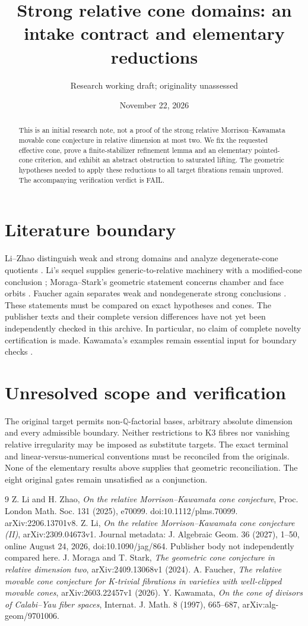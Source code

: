 \documentclass[11pt]{article}
\title{Strong relative cone domains: an intake contract and elementary reductions}
\author{Research working draft; originality unassessed}
\date{November 22, 2026}
\begin{document}
\maketitle
\begin{abstract}
This is an initial research note, not a proof of the strong relative Morrison--Kawamata movable cone conjecture in relative dimension at most two. We fix the requested effective cone, prove a finite-stabilizer refinement lemma and an elementary pointed-cone criterion, and exhibit an abstract obstruction to saturated lifting. The geometric hypotheses needed to apply these reductions to all target fibrations remain unproved. The accompanying verification verdict is FAIL.
\end{abstract}

\section{Literature boundary}
Li--Zhao distinguish weak and strong domains and analyze degenerate-cone quotients \cite{LZ}. Li's sequel supplies generic-to-relative machinery with a modified-cone conclusion \cite{Li}; Moraga--Stark's geometric statement concerns chamber and face orbits \cite{MS}. Faucher again separates weak and nondegenerate strong conclusions \cite{F}. These statements must be compared on exact hypotheses and cones. The publisher texts and their complete version differences have not yet been independently checked in this archive. In particular, no claim of complete novelty certification is made. Kawamata's examples remain essential input for boundary checks \cite{K}.

\section{Unresolved scope and verification}
The original target permits non-$\mathbb Q$-factorial bases, arbitrary absolute dimension and every admissible boundary. Neither restrictions to K3 fibres nor vanishing relative irregularity may be imposed as substitute targets. The exact terminal and linear-versus-numerical conventions must be reconciled from the originals. None of the elementary results above supplies that geometric reconciliation. The eight original gates remain unsatisfied as a conjunction.
\begin{thebibliography}{9}
 Z. Li and H. Zhao, \emph{On the relative Morrison--Kawamata cone conjecture}, Proc. London Math. Soc. 131 (2025), e70099. doi:10.1112/plms.70099. arXiv:2206.13701v8.
 Z. Li, \emph{On the relative Morrison--Kawamata cone conjecture (II)}, arXiv:2309.04673v1. Journal metadata: J. Algebraic Geom. 36 (2027), 1--50, online August 24, 2026, doi:10.1090/jag/864. Publisher body not independently compared here.
 J. Moraga and T. Stark, \emph{The geometric cone conjecture in relative dimension two}, arXiv:2409.13068v1 (2024).
 A. Faucher, \emph{The relative movable cone conjecture for K-trivial fibrations in varieties with well-clipped movable cones}, arXiv:2603.22457v1 (2026).
 Y. Kawamata, \emph{On the cone of divisors of Calabi--Yau fiber spaces}, Internat. J. Math. 8 (1997), 665--687, arXiv:alg-geom/9701006.
\end{thebibliography}
\end{document}
